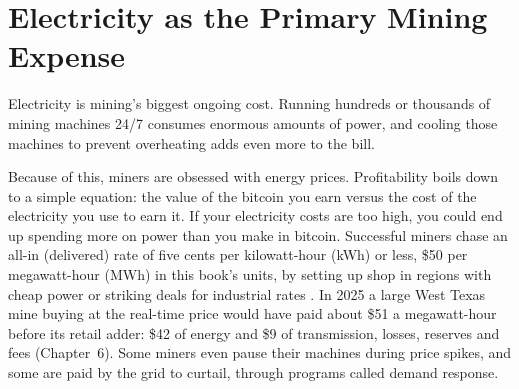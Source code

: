 \section{Electricity as the Primary Mining Expense}

Electricity is mining's biggest ongoing cost. Running hundreds or thousands of mining machines 24/7 consumes enormous amounts of power, and cooling those machines to prevent overheating adds even more to the bill.

Because of this, miners are obsessed with energy prices. Profitability boils down to a simple equation: the value of the bitcoin you earn versus the cost of the electricity you use to earn it. If your electricity costs are too high, you could end up spending more on power than you make in bitcoin. Successful miners chase an all-in (delivered) rate of five cents per kilowatt-hour (kWh) or less, \$50 per megawatt-hour (MWh) in this book's units, by setting up shop in regions with cheap power or striking deals for industrial rates \autocite{CBECI2026,riot2026q1prod}. In 2025 a large West Texas mine buying at the real-time price would have paid about \$51 a megawatt-hour before its retail adder: \$42 of energy and \$9 of transmission, losses, reserves and fees (Chapter~6). Some miners even pause their machines during price spikes, and some are paid by the grid to curtail, through programs called demand response. %

